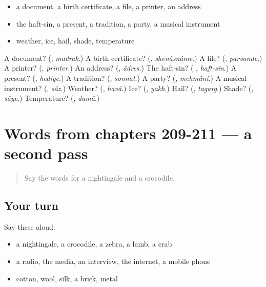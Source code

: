 \begin{itemize}
\raggedright
  \item a document, a birth certificate, a file, a printer, an address
  \item the haft-sin, a present, a tradition, a party, a musical instrument
  \item weather, ice, hail, shade, temperature
\end{itemize}

\begin{tcolorbox}[breakable,colback=teal!4,colframe=teal!35!black,title={Before you move on}]
A document? (\textbf{}, \emph{madrak}.) A birth certificate? (\textbf{}, \emph{shenâsnâme}.) A file? (\textbf{}, \emph{parvande}.) A printer? (\textbf{}, \emph{printer}.) An address? (\textbf{}, \emph{âdres}.) The haft-sin? (\textbf{ }, \emph{haft-sin}.) A present? (\textbf{}, \emph{hediye}.) A tradition? (\textbf{}, \emph{sonnat}.) A party? (\textbf{}, \emph{mehmâni}.) A musical instrument? (\textbf{}, \emph{sâz}.) Weather? (\textbf{}, \emph{havâ}.) Ice? (\textbf{}, \emph{yakh}.) Hail? (\textbf{}, \emph{tagarg}.) Shade? (\textbf{}, \emph{sâye}.) Temperature? (\textbf{}, \emph{damâ}.)
\end{tcolorbox}
\section[(dialogue)]{Words from chapters 209-211 — a second pass}

\label{lesson:FA-R211-second-pass-words-from-chapters-209-211}



\begin{quote}
Say the words for a nightingale and a crocodile.
\end{quote}

\subsection*{Your turn}
Say these aloud:

\begin{itemize}
\raggedright
  \item a nightingale, a crocodile, a zebra, a lamb, a crab
  \item a radio, the media, an interview, the internet, a mobile phone
  \item cotton, wool, silk, a brick, metal
\end{itemize}

